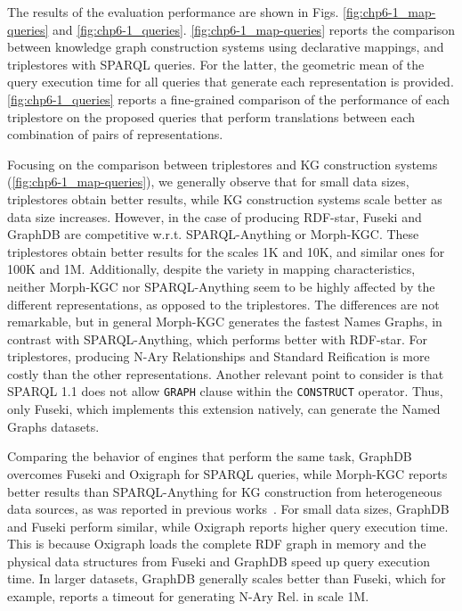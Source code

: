 The results of the evaluation performance are shown in Figs. \ref{fig:chp6-1_map-queries} and \ref{fig:chp6-1_queries}. \cref{fig:chp6-1_map-queries} reports the comparison between knowledge graph construction systems using declarative mappings, and triplestores with SPARQL queries. For the latter, the geometric mean of the query execution time for all queries that generate each representation is provided. \cref{fig:chp6-1_queries} reports a fine-grained comparison of the performance of each triplestore on the proposed queries that perform translations between each combination of pairs of representations.

Focusing on the comparison between triplestores and KG construction systems (\cref{fig:chp6-1_map-queries}), we generally observe that for small data sizes, triplestores obtain better results, while KG construction systems scale better as data size increases. However, in the case of producing RDF-star, Fuseki and GraphDB are competitive w.r.t. SPARQL-Anything or Morph-KGC. These triplestores obtain better results for the scales 1K and 10K, and similar ones for 100K and 1M. Additionally, despite the variety in mapping characteristics, neither Morph-KGC nor SPARQL-Anything seem to be highly affected by the different representations, as opposed to the triplestores. The differences are not remarkable, but in general Morph-KGC generates the fastest Names Graphs, in contrast with SPARQL-Anything, which performs better with RDF-star. For triplestores, producing N-Ary Relationships and Standard Reification is more costly than the other representations. Another relevant point to consider is that SPARQL 1.1 does not allow \texttt{GRAPH} clause within the \texttt{CONSTRUCT} operator. Thus, only Fuseki, which implements this extension natively, can generate the Named Graphs datasets.

Comparing the behavior of engines that perform the same task, GraphDB overcomes Fuseki and Oxigraph for SPARQL queries, while Morph-KGC reports better results than SPARQL-Anything for KG construction from heterogeneous data sources, as was reported in previous works~\citep{arenas2023morphstar}.
For small data sizes, GraphDB and Fuseki perform similar, while Oxigraph reports higher query execution time. This is because Oxigraph loads the complete RDF graph in memory and the physical data structures from Fuseki and GraphDB speed up query execution time. In larger datasets, GraphDB generally scales better than Fuseki, which for example, reports a timeout for generating N-Ary Rel. in scale 1M. 

